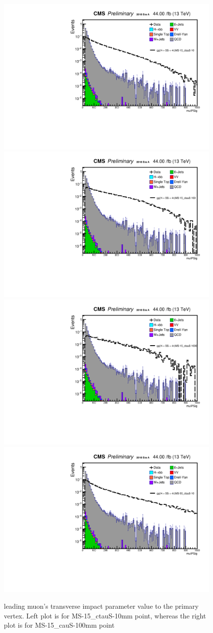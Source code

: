  \begin{figure}[h!]
   \caption{leading muon's transverse impact parameter value to the primary vertex. Left plot is for MS-15\_ctauS-10mm point, whereas the right plot is for MS-15\_cauS-100mm point}
   \label{fig:leadmuIP}
   \centering
   \includegraphics[width=0.47\linewidth]{figs/log_AnalysisNote_MS-15_ctauS-10_muIPSig.pdf}
   \includegraphics[width=0.47\linewidth]{figs/log_AnalysisNote_MS-15_ctauS-100_muIPSig.pdf}
   \includegraphics[width=0.47\linewidth]{figs/log_AnalysisNote_MS-15_ctauS-1000_muIPSig.pdf}
   \includegraphics[width=0.47\linewidth]{figs/log_AnalysisNote_MS-55_ctauS-10_muIPSig.pdf}
 \end{figure}

